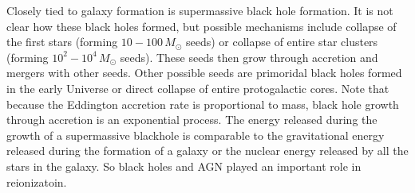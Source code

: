 Closely tied to galaxy formation is supermassive black hole formation.  It is 
not clear how these black holes formed, but possible mechanisms include 
collapse of the first stars (forming $10-100\,M_{\odot}$ seeds) or collapse of 
entire star clusters (forming $10^2-10^4\,M_{\odot}$ seeds).  These 
seeds then grow through accretion and mergers with other seeds.  Other 
possible seeds are primoridal black holes formed in the early Universe or 
direct collapse of entire protogalactic cores.  Note that because the 
Eddington accretion rate is proportional to mass, black hole growth through 
accretion is an exponential process.  The energy released during the 
growth of a supermassive blackhole is comparable to the gravitational 
energy released during the formation of a galaxy or the nuclear energy 
released by all the stars in the galaxy.  So black holes and AGN played an 
important role in reionizatoin.  



